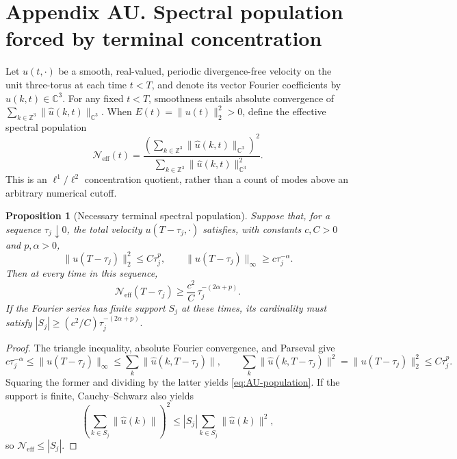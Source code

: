 \clearpage
\section*{Appendix AU. Spectral population forced by terminal concentration}

Let \(u(t,\cdot)\) be a smooth, real-valued, periodic divergence-free
velocity on the unit three-torus at each time \(t<T\), and denote its
vector Fourier coefficients by \(\widehat u(k,t)\in\mathbb C^3\).
For any fixed \(t<T\), smoothness entails absolute convergence of
\(\sum_{k\in\mathbb Z^3}\|\widehat u(k,t)\|_{\mathbb C^3}\).
When \(E(t)=\|u(t)\|_2^2>0\), define the effective spectral population
\[
 \mathcal N_{\mathrm{eff}}(t)=
 \frac{\left(\sum_{k\in\mathbb Z^3}
       \|\widehat u(k,t)\|_{\mathbb C^3}\right)^2}
      {\sum_{k\in\mathbb Z^3}
       \|\widehat u(k,t)\|_{\mathbb C^3}^2}.
\]
This is an \(\ell^1/\ell^2\) concentration quotient, rather than a
count of modes above an arbitrary numerical cutoff.

\newtheorem{auproposition}{Proposition}
\renewcommand{\theauproposition}{AU.\arabic{auproposition}}
\begin{auproposition}[Necessary terminal spectral population]
\label{prop:AU-population}
Suppose that, for a sequence \(\tau_j\downarrow0\), the total velocity
\(u(T-\tau_j,\cdot)\) satisfies, with constants \(c,C>0\) and
\(p,\alpha>0\),
\[
 \|u(T-\tau_j)\|_2^2\le C\tau_j^p,\qquad
 \|u(T-\tau_j)\|_\infty\ge c\tau_j^{-\alpha}.
\]
Then at every time in this sequence,
\begin{equation}\label{eq:AU-population}
 \mathcal N_{\mathrm{eff}}(T-\tau_j)\ge
  \frac{c^2}{C}\,\tau_j^{-(2\alpha+p)}.
\end{equation}
If the Fourier series has finite support \(S_j\) at these times, its
cardinality must satisfy
\(
 |S_j|\ge(c^2/C)\tau_j^{-(2\alpha+p)}.
\)
\end{auproposition}

\begin{proof}
The triangle inequality, absolute Fourier convergence, and Parseval give
\[
 c\tau_j^{-\alpha}
 \le \|u(T-\tau_j)\|_\infty
 \le\sum_k\|\widehat u(k,T-\tau_j)\|,
 \qquad
 \sum_k\|\widehat u(k,T-\tau_j)\|^2
 =\|u(T-\tau_j)\|_2^2
 \le C\tau_j^p.
\]
Squaring the former and dividing by the latter yields
\eqref{eq:AU-population}. If the support is finite,
Cauchy--Schwarz also yields
\[
 \left(\sum_{k\in S_j}\|\widehat u(k)\|\right)^2
 \le |S_j|\sum_{k\in S_j}\|\widehat u(k)\|^2,
\]
so \(\mathcal N_{\mathrm{eff}}\le |S_j|\).
\end{proof}

